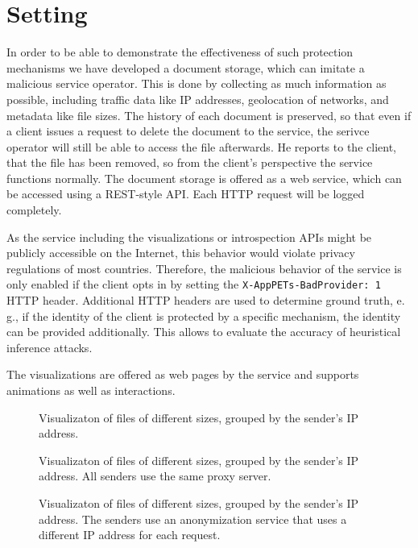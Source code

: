 \section{Setting}
In order to be able to demonstrate the effectiveness of such protection mechanisms we have developed a document storage, which can imitate a malicious service operator.
This is done by collecting as much information as possible, including traffic data like IP addresses, geolocation of networks, and metadata like file sizes.
The history of each document is preserved, so that even if a client issues a request to delete the document to the service, the serivce operator will still be able to access the file afterwards.
He reports to the client, that the file has been removed, so from the client's perspective the service functions normally.
The document storage is offered as a web service, which can be accessed using a REST-style API.
Each HTTP request will be logged completely.

As the service including the visualizations or introspection APIs might be publicly accessible on the Internet, this behavior would violate privacy regulations of most countries.
Therefore, the malicious behavior of the service is only enabled if the client opts in by setting the \texttt{X-AppPETs-BadProvider: 1} HTTP header.
Additional HTTP headers are used to determine ground truth, e.\,g., if the identity of the client is protected by a specific mechanism, the identity can be provided additionally.
This allows to evaluate the accuracy of heuristical inference attacks.

The visualizations are offered as web pages by the service and supports animations as well as interactions.


\begin{figure*}[t]
	\centering
	
	\caption{Visualizaton of files of different sizes, grouped by the sender's IP address.}%
	\label{fig:ip-treemap}
\end{figure*}

\begin{figure*}[t]
	\centering
	
	\caption{Visualizaton of files of different sizes, grouped by the sender's IP address. All senders use the same proxy server.}%
	\label{fig:proxy-treemap}
\end{figure*}

\begin{figure*}[t]
	\centering
	
	\caption{Visualizaton of files of different sizes, grouped by the sender's IP address. The senders use an anonymization service that uses a different IP address for each request.}%
	\label{fig:acn-treemap}
\end{figure*}

